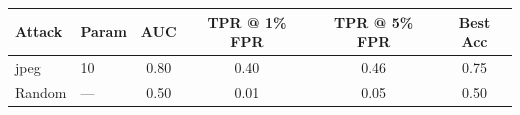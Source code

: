 \begin{tabular}{llcccc}
\toprule
Attack & Param & AUC & TPR @ 1\% FPR & TPR @ 5\% FPR & Best Acc \\
\midrule
jpeg & 10 & 0.80 & 0.40 & 0.46 & 0.75 \\
Random & — & 0.50 & 0.01 & 0.05 & 0.50 \\
\bottomrule
\end{tabular}
